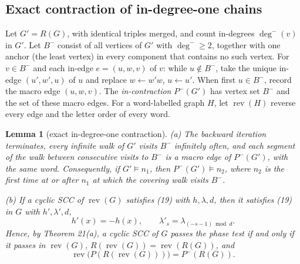 \documentclass[11pt,reqno]{amsart}
\newtheorem{lemma}[theorem]{Lemma}
\theoremstyle{definition}
\theoremstyle{remark}
\begin{document}
\subsection{Exact contraction of in-degree-one chains}\label{sec:F.2}

Let \(G'=R(G)\), with identical triples merged, and count in-degrees
\(\deg^-(v)\) in \(G'\). Let \(B^-\) consist of all vertices of \(G'\)
with \(\deg^-\ge2\), together with one anchor (the least vertex) in every
component that contains no such vertex. For \(v\in B^-\) and each
in-edge \(e=(u,w,v)\) of \(v\): while \(u\notin B^-\), take the unique
in-edge \((u',w',u)\) of \(u\) and replace \(w\leftarrow w'w\),
\(u\leftarrow u'\). When first \(u\in B^-\), record the macro edge
\((u,w,v)\). The \emph{in-contraction} \(P^-(G')\) has vertex set
\(B^-\) and the set of these macro edges. For a word-labelled graph
\(H\), let \(\operatorname{rev}(H)\) reverse every edge and the letter
order of every word.

\begin{samepage}
\begin{lemma}[exact in-degree-one contraction]\leavevmode\label{thm:75}
(a) The backward iteration terminates, every infinite walk of \(G'\)
visits \(B^-\) infinitely often, and each segment of the walk between
consecutive visits to \(B^-\) is a macro edge of \(P^-(G')\), with the
same word. Consequently, if \(G'\models n_1\), then
\(P^-(G')\models n_2\), where \(n_2\) is the first time at or after
\(n_1\) at which the covering walk visits \(B^-\).

(b) If a cyclic SCC of \(\operatorname{rev}(G)\) satisfies (19) with
\(h,\lambda,d\), then it satisfies (19) in \(G\) with \(h',\lambda',d\),
\[
h'(x)=-h(x),\qquad \lambda'_s=\lambda_{(-s-1)\bmod d}.
\]
Hence, by Theorem 21(a), a cyclic SCC of \(G\) passes the phase test if
and only if it passes in \(\operatorname{rev}(G)\),
\(R(\operatorname{rev}(G))=\operatorname{rev}(R(G))\), and
\[
\operatorname{rev}\bigl(P(R(\operatorname{rev}(G)))\bigr)=P^-(R(G)).
\]
\label{thm-end:75}
\end{lemma}
\end{samepage}
\end{document}
